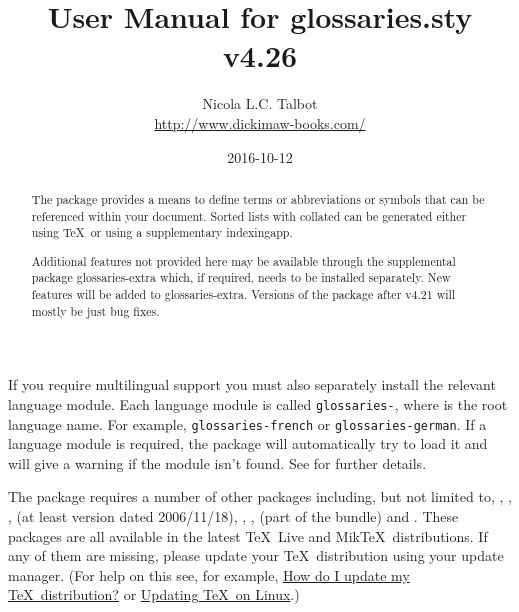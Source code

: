 \documentclass[report,inlinetitle,widecs]{nlctdoc}
\begin{document}
\DeleteShortVerb{\|}

 \title{User Manual for glossaries.sty v4.26}
 \author{Nicola L.C. Talbot\\%
  \url{http://www.dickimaw-books.com/}}

 \date{2016-10-12}
 \maketitle

\begin{abstract}
The  package provides a means to define terms or
abbreviations or symbols that can be referenced within your document.
Sorted lists with collated  can be 
generated either using \TeX\ or using a supplementary \gls{indexingapp}.

Additional features not provided here may be available through
the supplemental package \gls{glossaries-extra} which, if required,
needs to be installed separately. New features will be added to
\gls*{glossaries-extra}. Versions of the 
package after v4.21 will mostly be just bug fixes.
\end{abstract}

If you require multilingual support you must also separately install 
the relevant language module. Each language module is called
\texttt{glossaries-}, where  is the
root language name. For example, \texttt{glossaries-french}
or \texttt{glossaries-german}. If a language module is required,
the  package will automatically try to load it and
will give a warning if the module isn't found. See
 for further details.

The  package requires a number of other packages
including, but not limited to, , ,
,
 (at least version dated 2006/11/18), ,
,  (part of the  bundle) and . These
packages are all available in the latest \TeX\ Live and Mik\TeX\
distributions. If any of them are missing, please update your
\TeX\ distribution using your update manager.
(For help on this see, for example,
\href{http://tex.stackexchange.com/questions/55437/how-do-i-update-my-tex-distribution}{How
do I update my \TeX\ distribution?}
or
\href{http://tex.stackexchange.com/questions/14925/updating-tex-on-linux}{Updating
\TeX\ on Linux}.)
\end{document}
